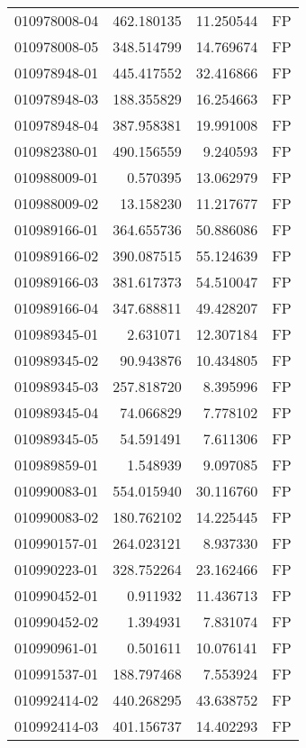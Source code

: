 \begin{tabular}{lrrl}
010978008-04 &  462.180135 &      11.250544 &   FP \\
010978008-05 &  348.514799 &      14.769674 &   FP \\
010978948-01 &  445.417552 &      32.416866 &   FP \\
010978948-03 &  188.355829 &      16.254663 &   FP \\
010978948-04 &  387.958381 &      19.991008 &   FP \\
010982380-01 &  490.156559 &       9.240593 &   FP \\
010988009-01 &    0.570395 &      13.062979 &   FP \\
010988009-02 &   13.158230 &      11.217677 &   FP \\
010989166-01 &  364.655736 &      50.886086 &   FP \\
010989166-02 &  390.087515 &      55.124639 &   FP \\
010989166-03 &  381.617373 &      54.510047 &   FP \\
010989166-04 &  347.688811 &      49.428207 &   FP \\
010989345-01 &    2.631071 &      12.307184 &   FP \\
010989345-02 &   90.943876 &      10.434805 &   FP \\
010989345-03 &  257.818720 &       8.395996 &   FP \\
010989345-04 &   74.066829 &       7.778102 &   FP \\
010989345-05 &   54.591491 &       7.611306 &   FP \\
010989859-01 &    1.548939 &       9.097085 &   FP \\
010990083-01 &  554.015940 &      30.116760 &   FP \\
010990083-02 &  180.762102 &      14.225445 &   FP \\
010990157-01 &  264.023121 &       8.937330 &   FP \\
010990223-01 &  328.752264 &      23.162466 &   FP \\
010990452-01 &    0.911932 &      11.436713 &   FP \\
010990452-02 &    1.394931 &       7.831074 &   FP \\
010990961-01 &    0.501611 &      10.076141 &   FP \\
010991537-01 &  188.797468 &       7.553924 &   FP \\
010992414-02 &  440.268295 &      43.638752 &   FP \\
010992414-03 &  401.156737 &      14.402293 &   FP \\

\end{tabular}
